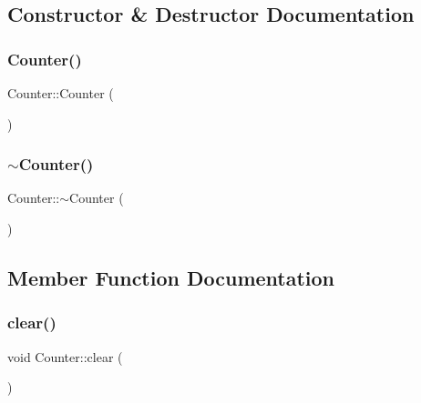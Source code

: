 \subsection{Constructor \& Destructor Documentation}
\hypertarget{class_counter_a1e05f69b5240fbab3e7ab351672167f0}{}\label{class_counter_a1e05f69b5240fbab3e7ab351672167f0} 
\subsubsection{\texorpdfstring{Counter()}{Counter()}}
{\footnotesize\ttfamily Counter\+::\+Counter (\begin{DoxyParamCaption}{ }\end{DoxyParamCaption})}

\hypertarget{class_counter_a97f4728470ae8eff37d50ef1d6bb0135}{}\label{class_counter_a97f4728470ae8eff37d50ef1d6bb0135} 
\subsubsection{\texorpdfstring{$\sim$\+Counter()}{~Counter()}}
{\footnotesize\ttfamily Counter\+::$\sim$\+Counter (\begin{DoxyParamCaption}{ }\end{DoxyParamCaption})}



\subsection{Member Function Documentation}
\hypertarget{class_counter_af66c74ac2bc69fa4f30c34377f869596}{}\label{class_counter_af66c74ac2bc69fa4f30c34377f869596} 
\subsubsection{\texorpdfstring{clear()}{clear()}}
{\footnotesize\ttfamily void Counter\+::clear (\begin{DoxyParamCaption}{ }\end{DoxyParamCaption})}

\hypertarget{class_counter_a273aaa4592ef5fae6b7a90544d0ff6e0}{}\label{class_counter_a273aaa4592ef5fae6b7a90544d0ff6e0} 
